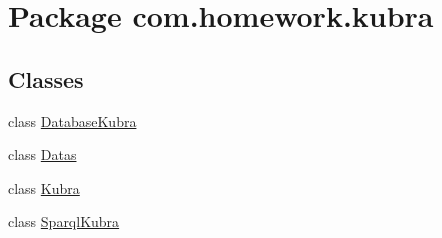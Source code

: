 \hypertarget{namespacecom_1_1homework_1_1kubra}{}\section{Package com.\+homework.\+kubra}
\label{namespacecom_1_1homework_1_1kubra}
\subsection*{Classes}
\begin{DoxyCompactItemize}
\item 
class \hyperlink{classcom_1_1homework_1_1kubra_1_1_database_kubra}{Database\+Kubra}
\item 
class \hyperlink{classcom_1_1homework_1_1kubra_1_1_datas}{Datas}
\item 
class \hyperlink{classcom_1_1homework_1_1kubra_1_1_kubra}{Kubra}
\item 
class \hyperlink{classcom_1_1homework_1_1kubra_1_1_sparql_kubra}{Sparql\+Kubra}
\end{DoxyCompactItemize}
